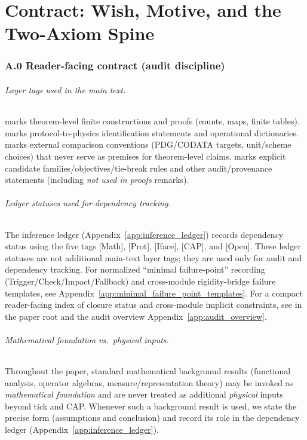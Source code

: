 \part{Contract: Wish, Motive, and the Two-Axiom Spine}

\section*{A.0 Reader-facing contract (audit discipline)}
\label{sec:paper_contract}

\paragraph{Layer tags used in the main text.}
\MathTag marks theorem-level finite constructions and proofs (counts, maps, finite tables).
\InterfaceTag marks protocol-to-physics identification statements and operational dictionaries.
\MatchTag marks external comparison conventions (PDG/CODATA targets, unit/scheme choices) that never serve as premises for theorem-level claims.
\AuditTag marks explicit candidate families/objectives/tie-break rules and other audit/provenance statements (including \emph{not used in proofs} remarks).

\paragraph{Ledger statuses used for dependency tracking.}
The inference ledger (Appendix~\ref{app:inference_ledger}) records dependency status using the five tags \textsf{[Math]}, \textsf{[Prot]}, \textsf{[Iface]}, \textsf{[CAP]}, and \textsf{[Open]}.
These ledger statuses are not additional main-text layer tags; they are used only for audit and dependency tracking.
\AuditTag For normalized ``minimal failure-point'' recording (Trigger/Check/Impact/Fallback) and cross-module rigidity-bridge failure templates, see Appendix~\ref{app:minimal_failure_point_templates}.
For a compact reader-facing index of closure status and cross-module implicit constraints, see  in the paper root and the audit overview Appendix~\ref{app:audit_overview}.

\paragraph{Mathematical foundation vs.\ physical inputs.}
\AuditTag Throughout the paper, standard mathematical background results (functional analysis, operator algebras, measure/representation theory) may be invoked as \emph{mathematical foundation} and are never treated as additional \emph{physical} inputs beyond tick and CAP.
Whenever such a background result is used, we state the precise form (assumptions and conclusion) and record its role in the dependency ledger (Appendix~\ref{app:inference_ledger}).

